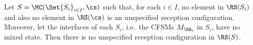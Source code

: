 % 
 

\begin{proposition}%
\label{prop:nurPreservation}
Let $S = \MC(\Set{S_i}_{i\in I}, \cs)$ such that, for each $i\in I$, no element in $\RS(S_{i})$ and also no element in
$\RS(\cs)$ is an unspecified reception configuration.
Moreover, let the interfaces of each $S_i$,
i.e.\ the CFSMs $M_{\hh_i}$ in $S_i$, have no mixed state.
Then there is no unspecified reception configuration in $\RS(S)$.
\end{proposition}



